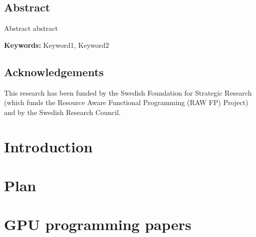 \documentclass[a4paper]{book}
\begin{document}
%

\clearpage

\section*{Abstract}
Abstract abstract 

\vspace{5mm}

\noindent

\textbf{Keywords:} Keyword1, Keyword2  

\clearpage

\section*{Acknowledgements}


\vspace{5mm}
This research has been funded by the Swedish Foundation for
Strategic Research (which funds the Resource Aware Functional 
Programming (RAW FP) Project) and by the Swedish Research Council.


\tableofcontents


\newpage


\chapter{Introduction}

\chapter{Plan}





\clearpage{}


%
%




\chapter{GPU programming papers}

% 
\cleardoublepage 
\end{document}
